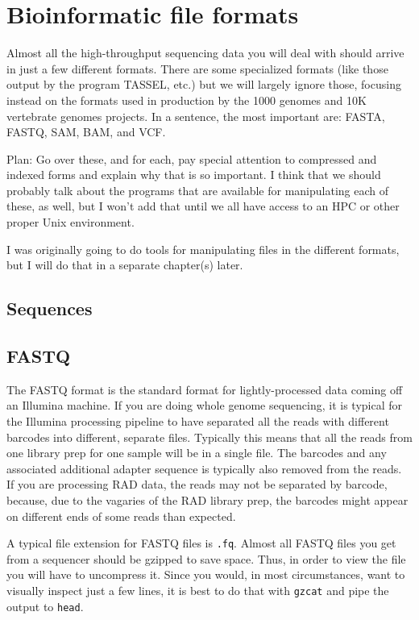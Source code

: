 \documentclass[]{krantz}
\begin{document}
\hypertarget{bioinformatic-file-formats}{%
\chapter{Bioinformatic file formats}\label{bioinformatic-file-formats}}

Almost all the high-throughput sequencing data you will deal with should
arrive in just a few different formats. There are some specialized formats
(like those output by the program TASSEL, etc.) but we will largely ignore
those, focusing instead on the formats used in production by the 1000 genomes
and 10K vertebrate genomes projects. In a sentence, the most important are:
FASTA, FASTQ, SAM, BAM, and VCF.

Plan: Go over these, and for each, pay special attention to compressed and indexed
forms and explain why that is so important. I think that we should probably
talk about the programs that are available for manipulating each of these, as well,
but I won't add that until we all have access to an HPC or other proper
Unix environment.

I was originally going to do tools for manipulating files in the different
formats, but I will do that in a separate chapter(s) later.

\hypertarget{sequences}{%
\section{Sequences}\label{sequences}}

\hypertarget{fastq}{%
\section{FASTQ}\label{fastq}}

The FASTQ format is the standard format for lightly-processed data
coming off an Illumina machine. If you are doing whole genome sequencing,
it is typical for the Illumina processing pipeline to have separated all
the reads with different barcodes into different, separate files. Typically
this means that all the reads from one library prep for one sample will
be in a single file. The barcodes and any associated additional adapter
sequence is typically also removed from the reads. If you are processing
RAD data, the reads may not be separated by barcode, because, due to the
vagaries of the RAD library prep, the barcodes might appear on different ends
of some reads than expected.

A typical file extension for FASTQ files is \texttt{.fq}.
Almost all FASTQ files you get from a sequencer should be gzipped to save space.
Thus, in order to view the file you will have to uncompress it. Since you would,
in most circumstances, want to visually inspect just a few lines, it is best
to do that with \texttt{gzcat} and pipe the output to \texttt{head}.
\end{document}
